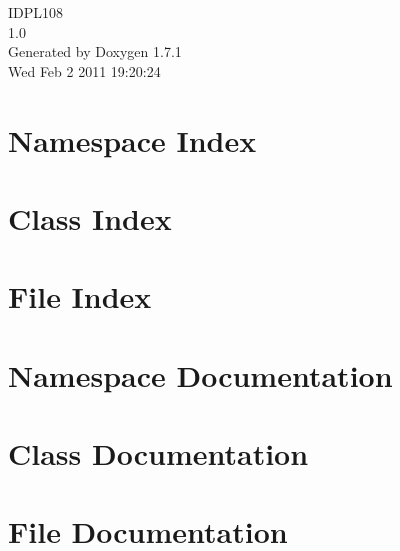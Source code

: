 \documentclass[a4paper]{book}
\begin{document}
\hypersetup{pageanchor=false}
\begin{titlepage}
\vspace*{7cm}
\begin{center}
{\Large IDPL108 \\[1ex]\large 1.0 }\\
\vspace*{1cm}
{\large Generated by Doxygen 1.7.1}\\
\vspace*{0.5cm}
{\small Wed Feb 2 2011 19:20:24}\\
\end{center}
\end{titlepage}
\clearemptydoublepage
{}
\tableofcontents
\clearemptydoublepage
{}
\hypersetup{pageanchor=true}
\chapter{Namespace Index}

\chapter{Class Index}

\chapter{File Index}

\chapter{Namespace Documentation}

\chapter{Class Documentation}








\chapter{File Documentation}















\printindex
\end{document}
